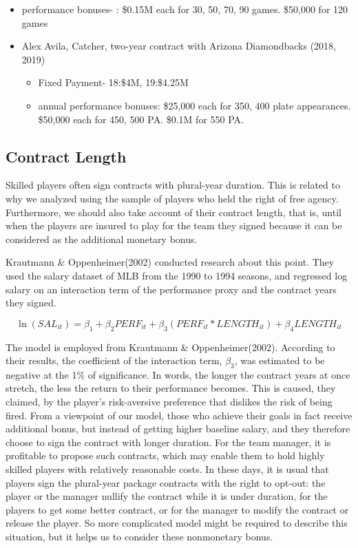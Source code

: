 \documentclass[dvipdfmx, 12pt]{article}
\begin{document}
\begin{table}
\begin{itemize}
\begin{itemize}
      \item performance bonuses- : \$0.15M each for 30, 50, 70, 90 games. \$50,000 for 120 games
    \end{itemize}
  \end{itemize}
  \begin{itemize}
  \item Alex Avila, Catcher, two-year contract with Arizona Diamondbacks (2018, 2019)

  \begin{itemize}
    \item Fixed Payment- 18:\$4M, 19:\$4.25M

    \item annual performance bonuses: \$25,000 each for 350, 400 plate appearances. \$50,000 each for 450, 500 PA. \$0.1M for 550 PA.
  \end{itemize}
 \end{itemize}
\end{table}

\subsection{Contract Length}

Skilled players often sign contracts with plural-year duration. This is related to why we analyzed using the sample of players who held the right of free agency. Furthermore, we should also take account of their contract length, that is, until when the players are insured to play for the team they signed because it can be considered as the additional monetary bonus.

Krautmann \& Oppenheimer(2002) conducted research about this point. They used the salary dataset of MLB from the 1990 to 1994 seasons, and regressed log salary on an interaction term of the performance proxy and the contract years they signed.

\[
\ln(SAL_{it}) = \beta_1 + \beta_2 PERF_{it} + \beta_3 (PERF_{it} * LENGTH_{it})+ \beta_4 LENGTH_{it}
\]

The model is employed from Krautmann \& Oppenheimer(2002). According to their results, the coefficient of the interaction term, $\beta_3$, was estimated to be negative at the 1\% of significance. In words, the longer the contract years at once stretch, the less the return to their performance becomes. This is caused, they claimed, by the player's risk-aversive preference that dislikes the risk of being fired. From a viewpoint of our model, those who achieve their goals in fact receive additional bonus, but instead of getting higher baseline salary, and they therefore choose to sign the contract with longer duration. For the team manager, it is profitable to propose such contracts, which may enable them to hold highly skilled players with relatively reasonable costs. In these days, it is usual that players sign the plural-year package contracts with the right to opt-out: the player or the manager nullify the contract while it is under duration, for the players to get some better contract, or for the manager to modify the contract or release the player. So more complicated model might be required to describe this situation, but it helps us to consider these nonmonetary bonus.
\end{document}
